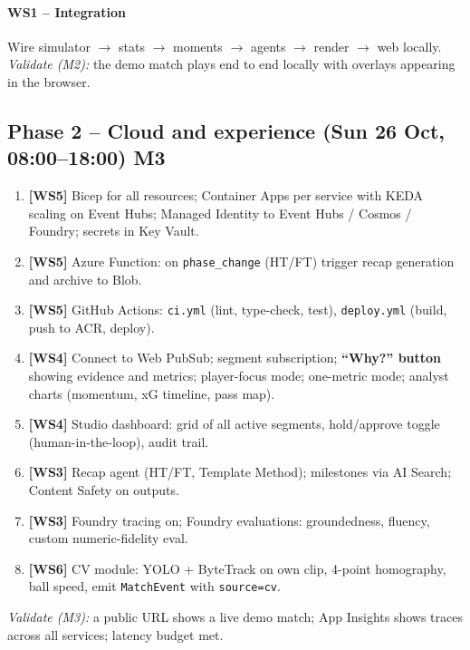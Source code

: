\documentclass[11pt,a4paper]{article}
\begin{document}
\paragraph{WS1 -- Integration}
Wire simulator $\rightarrow$ stats $\rightarrow$ moments $\rightarrow$ agents $\rightarrow$ render $\rightarrow$ web locally.
\textit{Validate (M2):} the demo match plays end to end locally with overlays appearing in the browser.

\subsection[Phase 2 -- Cloud and experience (Sun 26 Oct, 08:00--18:00)]{Phase 2 -- Cloud and experience (Sun 26 Oct, 08:00--18:00) \hfill M3}
\begin{enumerate}
  \item \textbf{[WS5]} Bicep for all resources; Container Apps per service with KEDA scaling on Event Hubs;
        Managed Identity to Event Hubs / Cosmos / Foundry; secrets in Key Vault.
  \item \textbf{[WS5]} Azure Function: on \texttt{phase\_change} (HT/FT) trigger recap generation and archive to Blob.
  \item \textbf{[WS5]} GitHub Actions: \texttt{ci.yml} (lint, type-check, test), \texttt{deploy.yml} (build, push to ACR, deploy).
  \item \textbf{[WS4]} Connect to Web PubSub; segment subscription; \textbf{``Why?'' button} showing evidence and metrics;
        player-focus mode; one-metric mode; analyst charts (momentum, xG timeline, pass map).
  \item \textbf{[WS4]} Studio dashboard: grid of all active segments, hold/approve toggle (human-in-the-loop), audit trail.
  \item \textbf{[WS3]} Recap agent (HT/FT, Template Method); milestones via AI Search; Content Safety on outputs.
  \item \textbf{[WS3]} Foundry tracing on; Foundry evaluations: groundedness, fluency, custom numeric-fidelity eval.
  \item \textbf{[WS6]} CV module: YOLO + ByteTrack on own clip, 4-point homography, ball speed, emit \texttt{MatchEvent} with \texttt{source=cv}.
\end{enumerate}
\textit{Validate (M3):} a public URL shows a live demo match; App Insights shows traces across all services; latency budget met.

\end{document}
